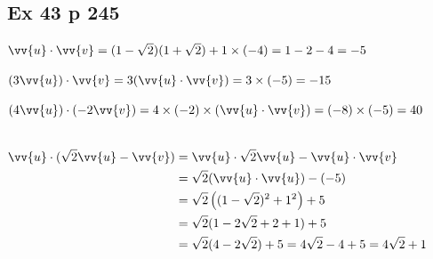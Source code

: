 \documentclass[12pt,a4paper]{book}
\begin{document}
\subsection*{Ex 43 p 245}
\begin{enumMet}
    \item $ \vv{u} \cdot  \vv{v}=(1-\sqrt{2})(1+\sqrt{2})+1 \times(-4)=1-2-4=-5$


    \item $(3  \vv{u}) \cdot  \vv{v}=3( \vv{u} \cdot  \vv{v})=3 \times(-5)=-15$
    \item $(4  \vv{u}) \cdot(-2  \vv{v})=4 \times(-2) \times( \vv{u} \cdot  \vv{v})=(-8) \times(-5)=40$
    \item \ \\
    $\begin{aligned}  \vv{u} \cdot(\sqrt{2}  \vv{u}- \vv{v}) &= \vv{u} \cdot \sqrt{2}  \vv{u}- \vv{u} \cdot  \vv{v} \\ &=\sqrt{2}( \vv{u} \cdot  \vv{u})-(-5) \\ &=\sqrt{2}\left((1-\sqrt{2})^{2}+1^{2}\right)+5 \\ &=\sqrt{2}(1-2 \sqrt{2}+2+1)+5 \\ &=\sqrt{2}(4-2 \sqrt{2})+5=4 \sqrt{2}-4+5=4 \sqrt{2}+1 \end{aligned}$
\end{enumMet}
\end{document}

